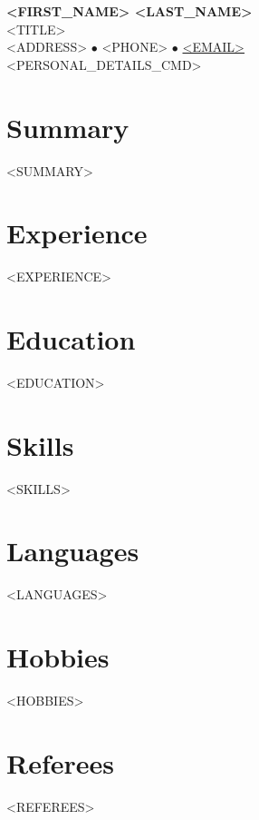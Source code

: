 \documentclass[11pt,a4paper]{article}
\begin{document}
\begin{center}
    {\Huge \textbf{<FIRST_NAME> <LAST_NAME>}} \\ \vspace{2mm}
    {\Large \textcolor{primary}{<TITLE>}} \\ \vspace{2mm}
    <ADDRESS> $\bullet$ <PHONE> $\bullet$ \href{mailto:<EMAIL>}{<EMAIL>} \\
    <PERSONAL_DETAILS_CMD>
\end{center}

\vspace{5mm}
\section*{Summary}
<SUMMARY>

\section*{Experience}
<EXPERIENCE>

\section*{Education}
<EDUCATION>

\section*{Skills}
<SKILLS>

\section*{Languages}
<LANGUAGES>

\section*{Hobbies}
<HOBBIES>

\section*{Referees}
<REFEREES>
\end{document}
